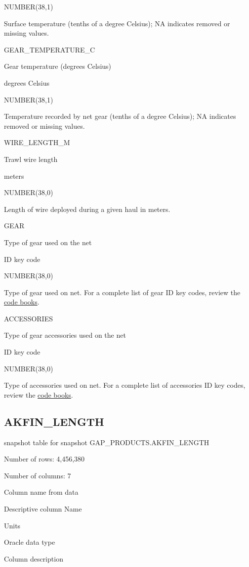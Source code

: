 \documentclass[
  letterpaper,
  oneside,
  open=any]{scrbook}
\begin{document}
NUMBER(38,1)

Surface temperature (tenths of a degree Celsius); NA indicates removed
or missing values.

GEAR\_TEMPERATURE\_C

Gear temperature (degrees Celsius)

degrees Celsius

NUMBER(38,1)

Temperature recorded by net gear (tenths of a degree Celsius); NA
indicates removed or missing values.

WIRE\_LENGTH\_M

Trawl wire length

meters

NUMBER(38,0)

Length of wire deployed during a given haul in meters.

GEAR

Type of gear used on the net

ID key code

NUMBER(38,0)

Type of gear used on net. For a complete list of gear ID key codes,
review the
\href{https://www.fisheries.noaa.gov/resource/document/groundfish-survey-species-code-manual-and-data-codes-manual}{code
books}.

ACCESSORIES

Type of gear accessories used on the net

ID key code

NUMBER(38,0)

Type of accessories used on net. For a complete list of accessories ID
key codes, review the
\href{https://www.fisheries.noaa.gov/resource/document/groundfish-survey-species-code-manual-and-data-codes-manual}{code
books}.

\subsection{AKFIN\_LENGTH}\label{akfin_length}

snapshot table for snapshot GAP\_PRODUCTS.AKFIN\_LENGTH

Number of rows: 4,456,380

Number of columns: 7

Column name from data

Descriptive column Name

Units

Oracle data type

Column description
\end{document}
